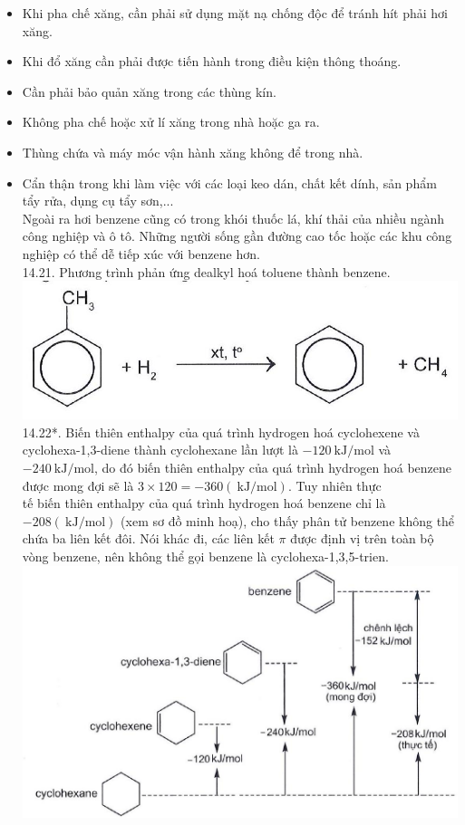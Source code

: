 \documentclass[10pt]{article}
\begin{document}
\begin{itemize}
  \item Khi pha chế xăng, cần phải sử dụng mặt nạ chống độc để tránh hít phải hơi xăng.
  \item Khi đổ xăng cần phải được tiến hành trong điều kiện thông thoáng.
  \item Cần phải bảo quản xăng trong các thùng kín.
  \item Không pha chế hoặc xử lí xăng trong nhà hoặc ga ra.
  \item Thùng chứa và máy móc vận hành xăng không để trong nhà.
  \item Cẩn thận trong khi làm việc với các loại keo dán, chất kết dính, sản phẩm tẩy rửa, dụng cụ tẩy sơn,...\\
Ngoài ra hơi benzene cũng có trong khói thuốc lá, khí thải của nhiều ngành công nghiệp và ô tô. Những người sống gần đường cao tốc hoặc các khu công nghiệp có thể dễ tiếp xúc với benzene hơn.\\
14.21. Phương trình phản ứng dealkyl hoá toluene thành benzene.\\
\includegraphics[max width=\textwidth, center]{2025_10_23_adad5b98d65ac6665838g-27}\\
14.22*. Biến thiên enthalpy của quá trình hydrogen hoá cyclohexene và cyclohexa-1,3-diene thành cyclohexane lần lượt là $-120 \mathrm{~kJ} / \mathrm{mol}$ và $-240 \mathrm{~kJ} / \mathrm{mol}$, do đó biến thiên enthalpy của quá trình hydrogen hoá benzene được mong đợi sẽ là $3 \times 120=-360(\mathrm{~kJ} / \mathrm{mol})$. Tuy nhiên thực\\
tế biến thiên enthalpy của quá trình hydrogen hoá benzene chỉ là $-208(\mathrm{~kJ} / \mathrm{mol})$ (xem sơ đồ minh hoạ), cho thấy phân tử benzene không thể chứa ba liên kết đôi. Nói khác đi, các liên kết $\pi$ được định vị trên toàn bộ vòng benzene, nên không thể gọi benzene là cyclohexa-1,3,5-trien.\\
\includegraphics[max width=\textwidth, center]{2025_10_23_adad5b98d65ac6665838g-28(3)}
\end{itemize}
\end{document}
